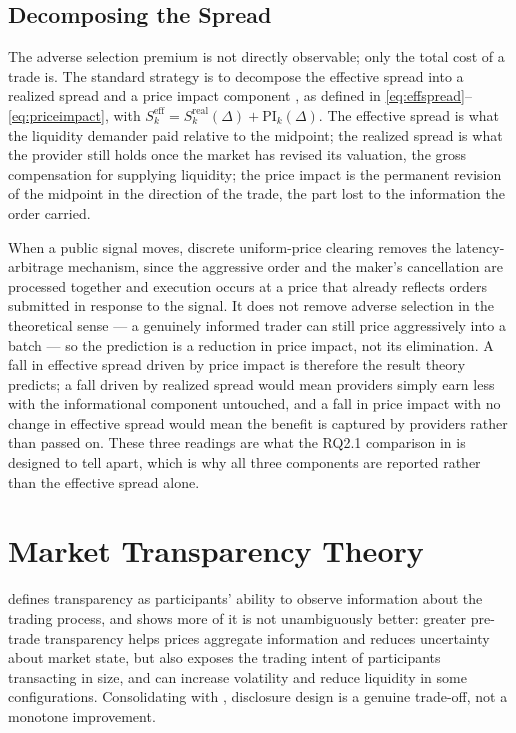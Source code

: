 \subsection{Decomposing the Spread}
\label{sec:spread-decomposition}

The adverse selection premium is not directly observable; only the total
cost of a trade is. The standard strategy is to decompose the effective
spread into a realized spread and a price impact component
\citep{hasbrouck1993assessing,hendershott2011algorithmic}, as defined in
\eqref{eq:effspread}--\eqref{eq:priceimpact}, with $S^{\mathrm{eff}}_k =
S^{\mathrm{real}}_k(\Delta) + \mathrm{PI}_k(\Delta)$. The effective spread
is what the liquidity demander paid relative to the midpoint; the realized spread is what the provider still holds once the
market has revised its valuation, the gross compensation for supplying
liquidity; the price impact is the permanent revision of the midpoint in the
direction of the trade, the part lost to the information the order carried.

When a public signal moves, discrete uniform-price clearing removes the
latency-arbitrage mechanism, since the aggressive order and the maker's
cancellation are processed together and execution occurs at a price that
already reflects orders submitted in response to the signal. It does not
remove adverse selection in the theoretical sense --- a genuinely
informed trader can still price aggressively into a batch
\citep{eibelshauser2022fba} --- so the prediction is a reduction in
price impact, not its elimination. A fall in effective spread driven by
price impact is therefore the result theory predicts; a fall driven by
realized spread would mean providers simply earn less with the
informational component untouched, and a fall in price impact with no
change in effective spread would mean the benefit is captured by
providers rather than passed on. These three readings are what the
RQ2.1 comparison in  is designed to tell apart, which is
why all three components are reported rather than the effective spread
alone.

\section{Market Transparency Theory}
\label{sec:transparency}

\citet{madhavan1996transparency} defines transparency as participants'
ability to observe information about the trading process, and shows more
of it is not unambiguously better: greater pre-trade transparency helps
prices aggregate information and reduces uncertainty about market state,
but also exposes the trading intent of participants transacting in size,
and can increase volatility and reduce liquidity in some configurations.
Consolidating with \citet{ohara1995microstructure}, disclosure design is
a genuine trade-off, not a monotone improvement.

